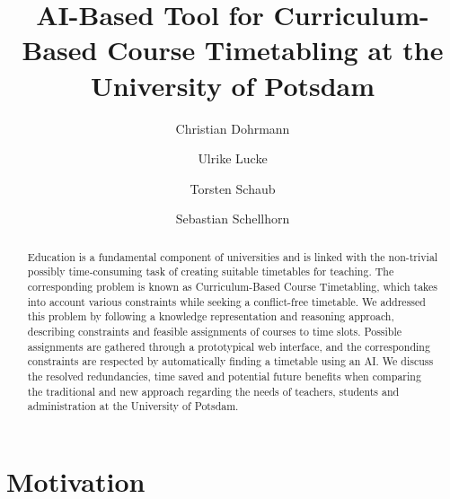 \documentclass{easychair}
\title{AI-Based Tool for Curriculum-Based Course Timetabling at the University of Potsdam}
\author{
Christian Dohrmann 
\and
Ulrike Lucke 
\and
Torsten Schaub 
\and 
Sebastian Schellhorn 
}
\institute{
  University of Potsdam,
  Germany\\
  \email{\{christian.dohrmann, ulrike.lucke, torsten.schaub, sebastian.schellhorn\}@uni-potsdam.de}
 }
\begin{document}
\maketitle

\begin{abstract}
    Education is a fundamental component of universities and is linked with the non-trivial possibly time-consuming task of creating suitable timetables for teaching. 
    The corresponding problem is known as Curriculum-Based Course Timetabling, which takes into account various constraints while seeking a conflict-free timetable. %
    We addressed this problem by following a knowledge representation and reasoning approach, describing constraints and feasible assignments of courses to time slots. 
    Possible assignments are gathered through a prototypical web interface, and the corresponding constraints are respected by automatically finding a timetable using an AI. %
    We discuss the resolved redundancies, time saved and potential future benefits when comparing the traditional and new approach regarding the needs of teachers, students and administration at the University of Potsdam. 
\end{abstract}



%
%

\section{Motivation}
\label{sec:motivation}
\end{document}
